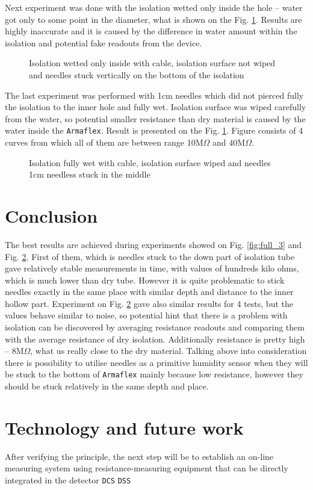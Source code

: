 \documentclass[a4paper, keeplastbox]{jacow}
\def\figurename{Fig.}
\begin{document}
Next experiment was done with the isolation wetted only inside the hole -- water got only to some point in the diameter, what is shown on the \figurename{} \ref{fig:inside}. Results are highly inaccurate and it is caused by the difference in water amount within the isolation and potential fake readouts from the device. 

\begin{figure}[H]
	\begin{center}
		\scalebox{.7}{}
	\end{center}
	\caption{Isolation wetted only inside with cable, isolation surface not wiped and needles stuck vertically on the bottom of the isolation}
	\label{fig:inside}
\end{figure}

The last experiment was performed with 1cm needles which did not pierced fully the isolation to the inner hole and fully wet. Isolation surface was wiped carefully from the water, so potential smaller resistance than dry material is caused by the water inside the \verb|Armaflex|. Result is presented on the \figurename{} \ref{fig:inside}. Figure consists of 4 curves from which all of them are between range 10M$\Omega$ and 40M$\Omega$.

\begin{figure}[H]
	\begin{center}
		\scalebox{.7}{}
	\end{center}
	\caption{Isolation fully wet with cable, isolation surface wiped and needles 1cm needless stuck in the middle}
	\label{fig:inside_short}
\end{figure}

\section{Conclusion}
The best results are achieved during experiments showed on \figurename{} \ref{fig:full_3} and \figurename{} \ref{fig:inside_short}. First of them, which is needles stuck to the down part of isolation tube gave relatively stable measurements in time, with values of hundreds kilo ohms, which is much lower than dry tube. However it is quite problematic to stick needles exactly in the same place with similar depth and distance to the inner hollow part. Experiment on \figurename{} \ref{fig:inside_short} gave also similar results for 4 tests, but the values behave similar to noise, so potential hint that there is a problem with isolation can be discovered by averaging resistance readouts and comparing them with the average resistance of dry isolation. Additionally resistance is pretty high -- 8M$\Omega$, what us really close to the dry material. Talking above into consideration there is possibility to utilise needles as a primitive humidity sensor when they will be stuck to the bottom of \verb|Armaflex| mainly because low resistance, however they should be stuck relatively in the same depth and place.

\section{Technology and future work}
After verifying the principle, the next step will be to establish an on-line measuring system using resistance-measuring equipment that can be directly integrated in the detector \verb|DCS| \verb|DSS|

\listoffigures
\end{document}
